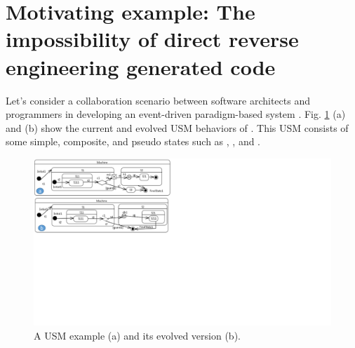 \section{Motivating example: The impossibility of direct reverse engineering generated code}
\label{sec:motivation}
Let's consider a collaboration scenario between software architects and programmers in developing an event-driven paradigm-based system . 
Fig. \ref{fig:illustration} (a) and (b) show the current and evolved USM behaviors of .
This USM consists of some simple, composite, and pseudo states such as , , and .

\begin{figure}
	\centering
	\includegraphics[clip, trim=0cm 10.6cm 18.3cm 0.1cm, width=1.0\columnwidth]{figures/illustration}
	\caption{A USM example (a) and its evolved version (b).} 
	\label{fig:illustration}
\end{figure}


